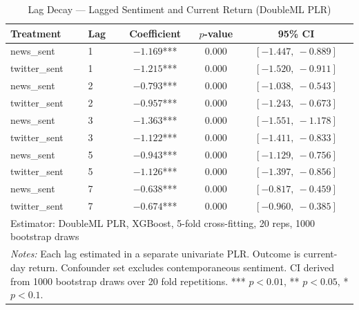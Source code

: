 \begin{table}[htbp]
\centering
\caption{Lag Decay --- Lagged Sentiment and Current Return (DoubleML PLR)\label{tab:lag_decay}}
\small
\begin{tabular}{llccc}
\hline\hline
Treatment & Lag & Coefficient & $p$-value & 95\% CI \\
\hline
news\_sent    & 1 & $-1.169$*** & 0.000 & $[-1.447,\ -0.889]$ \\
twitter\_sent & 1 & $-1.215$*** & 0.000 & $[-1.520,\ -0.911]$ \\
news\_sent    & 2 & $-0.793$*** & 0.000 & $[-1.038,\ -0.543]$ \\
twitter\_sent & 2 & $-0.957$*** & 0.000 & $[-1.243,\ -0.673]$ \\
news\_sent    & 3 & $-1.363$*** & 0.000 & $[-1.551,\ -1.178]$ \\
twitter\_sent & 3 & $-1.122$*** & 0.000 & $[-1.411,\ -0.833]$ \\
news\_sent    & 5 & $-0.943$*** & 0.000 & $[-1.129,\ -0.756]$ \\
twitter\_sent & 5 & $-1.126$*** & 0.000 & $[-1.397,\ -0.856]$ \\
news\_sent    & 7 & $-0.638$*** & 0.000 & $[-0.817,\ -0.459]$ \\
twitter\_sent & 7 & $-0.674$*** & 0.000 & $[-0.960,\ -0.385]$ \\
\hline
\multicolumn{5}{l}{Estimator: DoubleML PLR, XGBoost, 5-fold cross-fitting, 20 reps, 1000 bootstrap draws} \\
\hline\hline
\multicolumn{5}{p{0.95\linewidth}}{\footnotesize \textit{Notes:} Each lag estimated in a separate univariate PLR. Outcome is current-day return. Confounder set excludes contemporaneous sentiment. CI derived from 1000 bootstrap draws over 20 fold repetitions. *** $p<0.01$, ** $p<0.05$, * $p<0.1$.} \\
\end{tabular}
\end{table}

